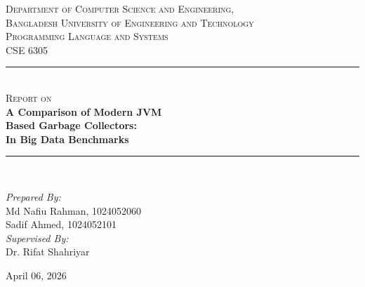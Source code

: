 \begin{titlepage}
    \centering

    {\large \textsc{Department of Computer Science and Engineering,}} \\
    {\Large \textsc{Bangladesh University of Engineering and Technology}} \\[3cm]

    {\large \textsc{Programming Language and Systems}} \\
    {\large CSE 6305} \\[1.5cm]

    \rule{\textwidth}{1pt} \\[0.5cm] %
    {\large \textsc{Report on}} \\[0.5cm]
    {\huge \bfseries A Comparison of Modern JVM \\[0.2cm] Based Garbage Collectors: \\[0.2cm] In Big Data Benchmarks} \\[0.4cm]
    \rule{\textwidth}{1pt} \\[2cm] %

    \begin{flushright}
        \textit{Prepared By:}\\
        Md Nafiu Rahman, 1024052060 \\
        Sadif Ahmed, 1024052101 \\[1cm]

        \textit{Supervised By:}\\
        Dr. Rifat Shahriyar
    \end{flushright}

    {\large April 06, 2026}

\end{titlepage}